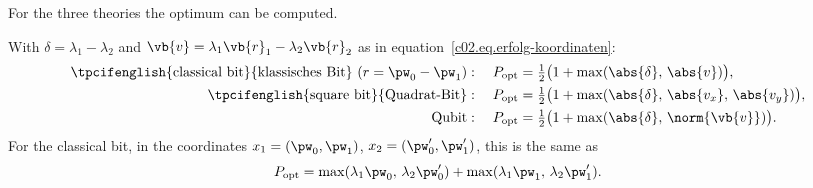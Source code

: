 For the three theories the optimum can be computed.

\begin{proposition}\label{c02.prop.optimum}
  With $\delta = \lambda_1 - \lambda_2$ and $\vb{v} = \lambda_1 \vb{r}_1 - \lambda_2 \vb{r}_2$
  as in equation~\eqref{c02.eq.erfolg-koordinaten}:
  \begin{align}
    \text{\tpcifenglish{classical bit}{klassisches Bit}}\ (r = \pw_0 - \pw_1):\quad
      P_{\mathrm{opt}} &= \tfrac12\bigl(1 + \max(\abs{\delta},\, \abs{v})\bigr),
      \label{c02.eq.opt-bit} \\
    \text{\tpcifenglish{square bit}{Quadrat-Bit}}:\quad
      P_{\mathrm{opt}} &= \tfrac12\bigl(1 + \max(\abs{\delta},\, \abs{v_x},\, \abs{v_y})\bigr),
      \label{c02.eq.opt-quadrat} \\
    \text{Qubit}:\quad
      P_{\mathrm{opt}} &= \tfrac12\bigl(1 + \max(\abs{\delta},\, \norm{\vb{v}})\bigr).
      \label{c02.eq.opt-qubit}
  \end{align}
  For the classical bit, in the coordinates $x_1 = (\pw_0, \pw_1)$,
  $x_2 = (\pw'_0, \pw'_1)$, this is the same as
  \begin{equation}\label{c02.eq.opt-bit-p}
    P_{\mathrm{opt}} = \max(\lambda_1 \pw_0,\, \lambda_2 \pw'_0) + \max(\lambda_1 \pw_1,\, \lambda_2 \pw'_1) .
  \end{equation}
\end{proposition}
